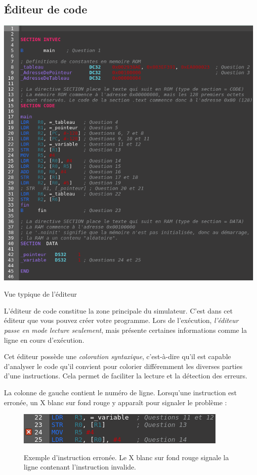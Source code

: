 \documentclass{tufte-handout}
\begin{document}
\clearpage

\subsection{Éditeur de code}

\begin{marginfigure}
\includegraphics[width=\linewidth]{pics/editeur.png}
\label{f:editeur}
\caption{Vue typique de l'éditeur}
\end{marginfigure}
L'éditeur de code constitue la zone principale du simulateur. C'est dans cet éditeur que vous pouvez créer votre programme. Lors de l'exécution, \emph{l'éditeur passe en mode lecture seulement}, mais présente certaines informations comme la ligne en cours d'exécution.

Cet éditeur possède une \emph{coloration syntaxique}, c'est-à-dire qu'il est capable d'analyser le code qu'il convient pour colorier différemment les diverses parties d'une instructions. Cela permet de faciliter la lecture et la détection des erreurs. 

La colonne de gauche contient le numéro de ligne. Lorsqu'une instruction est erronée, un X blanc sur fond rouge y apparaît pour signaler le problème :
\begin{figure}[h!]
\raggedleft
\includegraphics[width=0.9\linewidth]{pics/editeur_err.png}
\label{f:editeurerror}
\caption{Exemple d'instruction erronée. Le X blanc sur fond rouge signale la ligne contenant l'instruction invalide.}
\end{figure}
\end{document}
